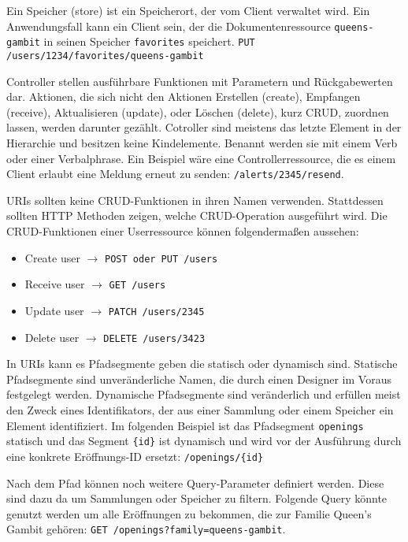 Ein Speicher (store) ist ein Speicherort, der vom Client verwaltet wird. Ein Anwendungsfall kann ein Client sein, der die Dokumentenressource \lstinline{queens-gambit} in seinen Speicher \lstinline{favorites} speichert. \lstinline{PUT /users/1234/favorites/queens-gambit}

Controller stellen ausführbare Funktionen mit Parametern und Rückgabewerten dar. Aktionen, die sich nicht den Aktionen Erstellen (create), Empfangen (receive), Aktualisieren (update), oder Löschen (delete), kurz CRUD, zuordnen lassen, werden darunter gezählt. Cotroller sind meistens das letzte Element in der Hierarchie und besitzen keine Kindelemente. Benannt werden sie mit einem Verb oder einer Verbalphrase. Ein Beispiel wäre eine Controllerressource, die es einem Client erlaubt eine Meldung erneut zu senden: \lstinline{/alerts/2345/resend}.

\ac{URI}s sollten keine CRUD-Funktionen in ihren Namen verwenden. Stattdessen sollten HTTP Methoden zeigen, welche CRUD-Operation ausgeführt wird. Die CRUD-Funktionen einer Userressource können folgendermaßen aussehen:

\begin{itemize}
  \item Create user $\rightarrow$ \lstinline{POST oder PUT /users}
  \item Receive user $\rightarrow$ \lstinline{GET /users}
  \item Update user $\rightarrow$ \lstinline{PATCH /users/2345}
  \item Delete user $\rightarrow$ \lstinline{DELETE /users/3423}
\end{itemize}

In \ac{URI}s kann es Pfadsegmente geben die statisch oder dynamisch sind. Statische Pfadsegmente sind unveränderliche Namen, die durch einen Designer im Voraus festgelegt werden. Dynamische Pfadsegmente sind veränderlich und erfüllen meist den Zweck eines Identifikators, der aus einer Sammlung oder einem Speicher ein Element identifiziert. Im folgenden Beispiel ist das Pfadsegment \lstinline{openings} statisch und das Segment \lstinline|{id}| ist dynamisch und wird vor der Ausführung durch eine konkrete Eröffnungs-ID ersetzt: \lstinline|/openings/{id}|

Nach dem Pfad können noch weitere Query-Parameter definiert werden. Diese sind dazu da um Sammlungen oder Speicher zu filtern. Folgende Query könnte genutzt werden um alle Eröffnungen zu bekommen, die zur Familie Queen's Gambit gehören: \lstinline{GET /openings?family=queens-gambit}.

\cite{masse_rest_2012}

